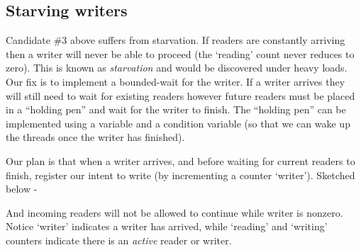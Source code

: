 \subsection{Starving writers}\label{starving-writers}

Candidate \#3 above suffers from starvation. If readers are constantly
arriving then a writer will never be able to proceed (the `reading'
count never reduces to zero). This is known as \emph{starvation} and
would be discovered under heavy loads. Our fix is to implement a
bounded-wait for the writer. If a writer arrives they will still need to
wait for existing readers however future readers must be placed in a
``holding pen'' and wait for the writer to finish. The ``holding pen''
can be implemented using a variable and a condition variable (so that we
can wake up the threads once the writer has finished).

Our plan is that when a writer arrives, and before waiting for current
readers to finish, register our intent to write (by incrementing a
counter `writer'). Sketched below -

\begin{Shaded}
\begin{Highlighting}[]

     
\NormalTok{\}}
\end{Highlighting}
\end{Shaded}

And incoming readers will not be allowed to continue while writer is
nonzero. Notice `writer' indicates a writer has arrived, while `reading'
and `writing' counters indicate there is an \emph{active} reader or
writer.

\begin{Shaded}
\begin{Highlighting}[]

     
\NormalTok{\}}
\end{Highlighting}
\end{Shaded}

